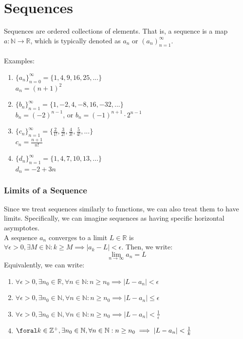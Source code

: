 \documentclass{article}
\begin{document}
\section{Sequences}
Sequences are ordered collections of elements. That is, a sequence is a map $a : \mathbb{N} \to \mathbb{R}$, which is typically denoted as $a_n$ or $(a_n)_{n=1}^{\infty}$.\\
\\
Examples:
\begin{enumerate}
    \item $\{a_n\}_{n=0}^\infty = \{1,4,9,16,25,...\}$\\
    $a_n = (n+1)^2$
    
    \item $\{b_n\}_{n=1}^{\infty} = \{1, -2, 4, -8, 16, -32, ...\}$\\
    $b_n = (-2)^{n-1}$, or $b_n = (-1)^{n+1} \cdot 2^{n-1}$
    
    \item $\{c_n\}_{n=1}^\infty = \{\frac{2}{1!}, \frac{3}{2!}, \frac{4}{3!}, \frac{5}{4!}, ...\}$\\
    $c_n = \frac{n+1}{n!}$
    
    \item $\{d_n\}_{n=1}^\infty = \{1,4,7,10,13,...\}$\\
    $d_n = -2 + 3n$
\end{enumerate}

\subsubsection{Limits of a Sequence}
Since we treat sequences similarly to functions, we can also treat them to have limits. Specifically, we can imagine sequences as having specific horizontal asymptotes.\\
A sequence $a_n$ converges to a limit $L \in \mathbb{R}$ is $\forall \epsilon > 0, \exists M \in \mathbb{N} : k \geq M \implies |a_k - L| < \epsilon$. Then, we write:
$$\lim_{n\to\infty} a_n = L$$
Equivalently, we can write:
\begin{enumerate}
    \item $\forall \epsilon > 0, \exists n_0 \in \mathbb{R}, \forall n \in \mathbb{N} : n \geq n_0 \implies |L - a_n| < \epsilon$
    
    \item $\forall \epsilon > 0, \exists n_0 \in \mathbb{N}, \forall n \in \mathbb{N} : n \geq n_0 \implies |L - a_n| \leq \epsilon$
    
    \item $\forall \epsilon > 0, \exists n_0 \in \mathbb{N}, \forall n \in \mathbb{N} : n \geq n_0 \implies |L - a_n| < \frac{1}{\epsilon}$
    
    \item $\foral k \in \mathbb{Z}^+, \exists n_0 \in \mathbb{N}, \forall n \in \mathbb{N} : n \geq n_0 \implies |L - a_n| < \frac{1}{k}$
\end{enumerate}
\end{document}
